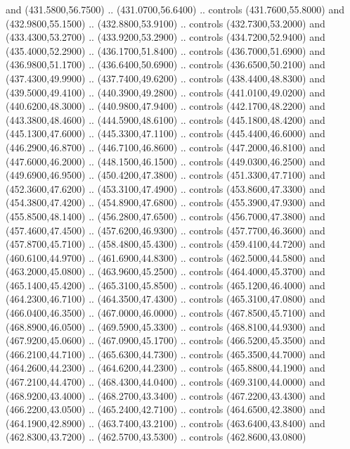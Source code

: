 {\begin{scope}[y=0.80pt, x=0.80pt, yscale=-1, xscale=1, inner sep=0pt, outer sep=0pt, #1]
      and (431.5800,56.7500) .. (431.0700,56.6400) .. controls (431.7600,55.8000)
      and (432.9800,55.1500) .. (432.8800,53.9100) .. controls (432.7300,53.2000)
      and (433.4300,53.2700) .. (433.9200,53.2900) .. controls (434.7200,52.9400)
      and (435.4000,52.2900) .. (436.1700,51.8400) .. controls (436.7000,51.6900)
      and (436.9800,51.1700) .. (436.6400,50.6900) .. controls (436.6500,50.2100)
      and (437.4300,49.9900) .. (437.7400,49.6200) .. controls (438.4400,48.8300)
      and (439.5000,49.4100) .. (440.3900,49.2800) .. controls (441.0100,49.0200)
      and (440.6200,48.3000) .. (440.9800,47.9400) .. controls (442.1700,48.2200)
      and (443.3800,48.4600) .. (444.5900,48.6100) .. controls (445.1800,48.4200)
      and (445.1300,47.6000) .. (445.3300,47.1100) .. controls (445.4400,46.6000)
      and (446.2900,46.8700) .. (446.7100,46.8600) .. controls (447.2000,46.8100)
      and (447.6000,46.2000) .. (448.1500,46.1500) .. controls (449.0300,46.2500)
      and (449.6900,46.9500) .. (450.4200,47.3800) .. controls (451.3300,47.7100)
      and (452.3600,47.6200) .. (453.3100,47.4900) .. controls (453.8600,47.3300)
      and (454.3800,47.4200) .. (454.8900,47.6800) .. controls (455.3900,47.9300)
      and (455.8500,48.1400) .. (456.2800,47.6500) .. controls (456.7000,47.3800)
      and (457.4600,47.4500) .. (457.6200,46.9300) .. controls (457.7700,46.3600)
      and (457.8700,45.7100) .. (458.4800,45.4300) .. controls (459.4100,44.7200)
      and (460.6100,44.9700) .. (461.6900,44.8300) .. controls (462.5000,44.5800)
      and (463.2000,45.0800) .. (463.9600,45.2500) .. controls (464.4000,45.3700)
      and (465.1400,45.4200) .. (465.3100,45.8500) .. controls (465.1200,46.4000)
      and (464.2300,46.7100) .. (464.3500,47.4300) .. controls (465.3100,47.0800)
      and (466.0400,46.3500) .. (467.0000,46.0000) .. controls (467.8500,45.7100)
      and (468.8900,46.0500) .. (469.5900,45.3300) .. controls (468.8100,44.9300)
      and (467.9200,45.0600) .. (467.0900,45.1700) .. controls (466.5200,45.3500)
      and (466.2100,44.7100) .. (465.6300,44.7300) .. controls (465.3500,44.7000)
      and (464.2600,44.2300) .. (464.6200,44.2300) .. controls (465.8800,44.1900)
      and (467.2100,44.4700) .. (468.4300,44.0400) .. controls (469.3100,44.0000)
      and (468.9200,43.4000) .. (468.2700,43.3400) .. controls (467.2200,43.4300)
      and (466.2200,43.0500) .. (465.2400,42.7100) .. controls (464.6500,42.3800)
      and (464.1900,42.8900) .. (463.7400,43.2100) .. controls (463.6400,43.8400)
      and (462.8300,43.7200) .. (462.5700,43.5300) .. controls (462.8600,43.0800)

\end{scope}}
